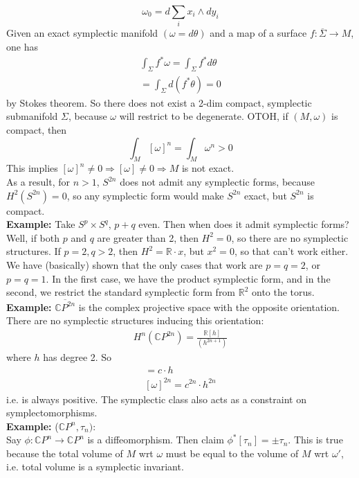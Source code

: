 \documentclass[12pt]{report}
\theoremstyle{definition}
\theoremstyle{remark}
\numberwithin{equation}{section}
\theoremstyle{definition}
\newcommand{\bb}[1]{\mathbb{#1}}
\begin{document}
$$
	\omega_0 = d\sum_i x_i \wedge dy_i
$$
Given an exact symplectic manifold $(\omega = d\theta)$ and a map of a surface $f: \overline\Sigma \to M$, one has 
\begin{gather*}
	\int_{\Sigma}f^* \omega = \int_{\Sigma}f^*d\theta \\
	= \int_\Sigma d(f^*\theta) = 0
\end{gather*}
by Stokes theorem. So there does not exist a 2-dim compact, symplectic submanifold $\Sigma$, because $\omega$ will restrict to be degenerate. OTOH, if $(M,\omega)$ is compact, then 
$$
\int_M [\omega]^n = \int_M \omega^n > 0
$$
This implies $[\omega]^n \ne 0 \Rightarrow [\omega] \ne 0 \Rightarrow M$ is not exact. \\
As a result, for $n > 1$, $S^{2n}$ does not admit any symplectic forms, because $H^2(S^{2n}) = 0$, so any symplectic form would make $S^{2n}$ exact, but $S^{2n}$ is compact. \\
\textbf{Example: }Take $S^p \times S^q$, $p + q$ even. Then when does it admit symplectic forms?\\
Well, if both $p$ and $q$ are greater than 2, then $H^2 = 0$, so there are no symplectic structures. If $p = 2, q > 2$, then $H^2 = \bb R \cdot x$, but $x^2 = 0$, so that can't work either. We have (basically) shown that the only cases that work are $p = q = 2$, or $p = q = 1$. In the first case, we have the product symplectic form, and in the second, we restrict the standard symplectic form from $\bb R^2$ onto the torus. \\
\textbf{Example: }$\overline{\bb CP^{2n}}$ is the complex projective space with the opposite orientation. There are no symplectic structures inducing this orientation: 
\begin{gather*}
	H^n(\bb CP^{2n}) = \frac{\bb R[h]}{(h^{2n+1})}
\end{gather*}
where $h$ has degree 2. So
\begin{gather*}
	[\omega] = c\cdot h \\
	[\omega]^{2n}= c^{2n}\cdot h^{2n}
\end{gather*}
i.e. is always positive. The symplectic class also acts as a constraint on symplectomorphisms. \\
\textbf{Example: }	($\bb CP^n, \tau_n)$:\\
Say $\phi: \bb CP^n \to \bb CP^n$ is a diffeomorphism. Then claim $\phi^*[\tau_n] = \pm \tau_n$. This is true because the total volume of $M$ wrt $\omega$ must be equal to the volume of $M$ wrt $\omega'$, i.e. total volume is a symplectic invariant. \\
\end{document}
